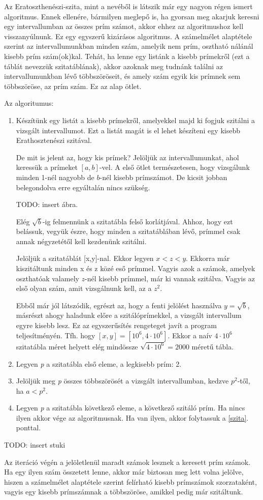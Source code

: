 \documentclass[twoside, a4paper, 12pt]{article}
\begin{document}
Az Eratoszthenészi-szita, mint a nevéből is látszik már egy nagyon régen ismert algoritmus. Ennek ellenére, bármilyen meglepő is, ha gyorsan meg akarjuk keresni egy intervallumban az összes prím számot, akkor ehhez az algoritmushoz kell visszanyúlnunk. Ez egy egyszerű kizárásos algoritmus. A számelmélet alaptétele szerint az intervallumunkban minden szám, amelyik nem prím, osztható nálánál kisebb prím szám(ok)kal. Tehát, ha lenne egy listánk a kisebb prímekről (ezt a táblát nevezzük szitatáblának), akkor azoknak meg tudnánk találni az intervallumunkban lévő többszöröseit, és amely szám egyik kis prímnek sem többszöröse, az prím szám. Ez az alap ötlet. \par
Az algoritumus: \par
\begin{enumerate}
\item Készítünk egy listát a kisebb prímekről, amelyekkel majd ki fogjuk szitálni a vizsgált intervallumot. Ezt a listát magát is el lehet készíteni egy kisebb Erathosztenészi szitával. \par
De mit is jelent az, hogy kis prímek? Jelöljük az intervallumunkat, ahol keressük a prímeket \( [a, b] \)-vel. A első ötlet természetesen, hogy vizsgálunk minden 1-nél nagyobb de \(b\)-nél kisebb prímszámot. De kicsit jobban belegondolva erre egyáltalán nincs szükség. \par 
TODO: insert ábra. \par
Elég $\sqrt{b}$-ig felmennünk a szitatábla felső korlátjával. Ahhoz, hogy ezt belássuk, vegyük észre, hogy minden a szitatáblában lévő, prímmel csak annak négyzetétől kell kezdenünk szitálni. \par 
Jelöljük a szitatáblát [x,y]-nal. Ekkor legyen $x < z < y$. Ekkorra már kiszitáltunk minden x és z közé eső prímmel. Vagyis azok a számok, amelyek oszthatóak valamely $z$-nél kisebb prímmel, már ki vannak szitálva. Vagyis az első olyan szám, amit vizsgálnunk kell, az a $z^2$. \par
Ebből már jól látszódik, egrészt az, hogy a fenti jelölést használva $y=\sqrt{b}$, másrészt ahogy haladunk előre a szitálóprímekkel, a vizsgált intervallum egyre kisebb lesz. Ez az egyszerűsítés rengeteget javít a program teljesítményén. Tfh. hogy $[x,y]=[10^6,4\cdot10^6]$. Ekkor a naív $4\cdot10^6$ szitatábla méret helyett elég mindössze $\sqrt{4\cdot10^6}=2000$ méretű tábla.
\item Legyen \textit{p} a szitatábla első eleme, a legkisebb prím: 2.
\item Jelöljük meg \textit{p} összes többszörösét a vizsgált intervallumban, kedzve $p^2$-től, ha $a<p^2 $. \label{szita}
\item Legyen \textit{p} a szitatábla következő eleme, a következő szitáló prím. Ha nincs ilyen akkor vége az algoritmusnak. Ha van ilyen, akkor folytassuk a \ref{szita}. ponttal.
\end{enumerate}
TODO: insert stuki \par
\bigskip
Az iteráció végén a jelöletlenül maradt számok lesznek a keresett prím számok. Ha egy ilyen szám összetett lenne, akkor már biztosan meg lett volna jelölve, hiszen a számelmélet alaptétele szerint felírható kisebb prímszámok szorzataként, vagyis egy kisebb prímszámnak a többszöröse, amikkel pedig már szitáltunk.
\end{document}
